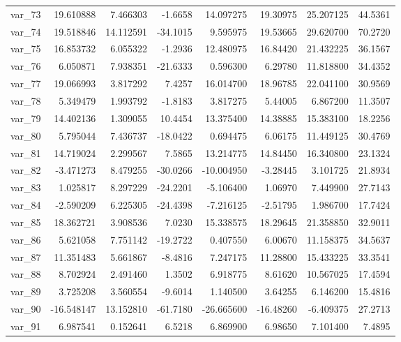 \documentclass[12pt]{article}
\begin{document}
\begin{longtable}{lrrrrrrr}
  var\_73 &  19.610888 &   7.466303 &  -1.6658 &  14.097275 &  19.30975 &  25.207125 &  44.5361 \\
  var\_74 &  19.518846 &  14.112591 & -34.1015 &   9.595975 &  19.53665 &  29.620700 &  70.2720 \\
  var\_75 &  16.853732 &   6.055322 &  -1.2936 &  12.480975 &  16.84420 &  21.432225 &  36.1567 \\
  var\_76 &   6.050871 &   7.938351 & -21.6333 &   0.596300 &   6.29780 &  11.818800 &  34.4352 \\
  var\_77 &  19.066993 &   3.817292 &   7.4257 &  16.014700 &  18.96785 &  22.041100 &  30.9569 \\
  var\_78 &   5.349479 &   1.993792 &  -1.8183 &   3.817275 &   5.44005 &   6.867200 &  11.3507 \\
  var\_79 &  14.402136 &   1.309055 &  10.4454 &  13.375400 &  14.38885 &  15.383100 &  18.2256 \\
  var\_80 &   5.795044 &   7.436737 & -18.0422 &   0.694475 &   6.06175 &  11.449125 &  30.4769 \\
  var\_81 &  14.719024 &   2.299567 &   7.5865 &  13.214775 &  14.84450 &  16.340800 &  23.1324 \\
  var\_82 &  -3.471273 &   8.479255 & -30.0266 & -10.004950 &  -3.28445 &   3.101725 &  21.8934 \\
  var\_83 &   1.025817 &   8.297229 & -24.2201 &  -5.106400 &   1.06970 &   7.449900 &  27.7143 \\
  var\_84 &  -2.590209 &   6.225305 & -24.4398 &  -7.216125 &  -2.51795 &   1.986700 &  17.7424 \\
  var\_85 &  18.362721 &   3.908536 &   7.0230 &  15.338575 &  18.29645 &  21.358850 &  32.9011 \\
  var\_86 &   5.621058 &   7.751142 & -19.2722 &   0.407550 &   6.00670 &  11.158375 &  34.5637 \\
  var\_87 &  11.351483 &   5.661867 &  -8.4816 &   7.247175 &  11.28800 &  15.433225 &  33.3541 \\
  var\_88 &   8.702924 &   2.491460 &   1.3502 &   6.918775 &   8.61620 &  10.567025 &  17.4594 \\
  var\_89 &   3.725208 &   3.560554 &  -9.6014 &   1.140500 &   3.64255 &   6.146200 &  15.4816 \\
  var\_90 & -16.548147 &  13.152810 & -61.7180 & -26.665600 & -16.48260 &  -6.409375 &  27.2713 \\
  var\_91 &   6.987541 &   0.152641 &   6.5218 &   6.869900 &   6.98650 &   7.101400 &   7.4895 \\

\end{longtable}
\end{document}
